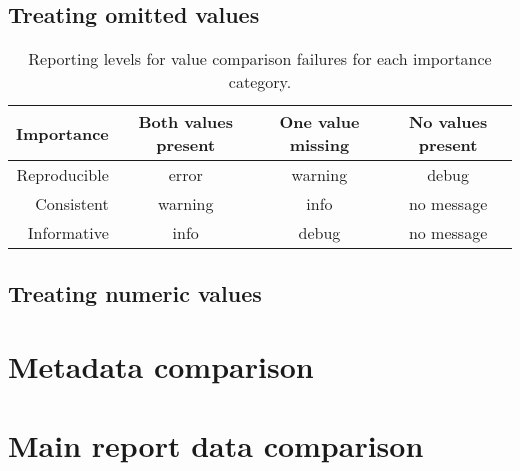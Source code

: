 \subsection{Treating omitted values}

\begin{table}\tablefont
\begin{tabular}{rccc}
\toprule
Importance & Both values present & One value missing & No values present \\
\midrule
Reproducible & error & warning & debug \\
Consistent & warning & info & no message \\
Informative & info & debug & no message \\
\bottomrule
\end{tabular}
\caption[Comparison failure reporting levels]{Reporting levels for value comparison failures for each importance category.}
\label{tab:importance}
\end{table}

\subsection{Treating numeric values}

\section{Metadata comparison}

\section{Main report data comparison}
\label{sec:cmpdata}
